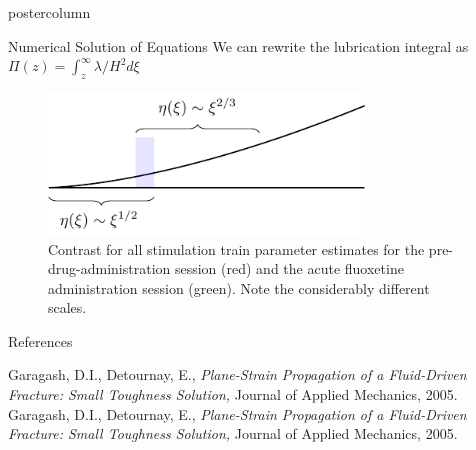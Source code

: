 \documentclass{beamer}
\begin{document}
\begin{frame}
\begin{columns}
\begin{column}{.57\textwidth}
\begin{beamercolorbox}[center]{postercolumn}
\begin{minipage}{.98\textwidth}
{\begin{myblock}{Numerical Solution of Equations}
We can rewrite the lubrication integral as
$\Pi(z) = \int_{z}^{\infty} \lambda/H^2 d\xi$
\begin{figure}
\begin{minipage}{0.85\textwidth}
\centering\includegraphics[width=0.75\textwidth, height=0.2\textwidth]
{Fig7.pdf}
\caption{Contrast for all stimulation train parameter estimates for the 
pre-drug-administration session (red) and the acute fluoxetine administration 
session (green). Note the considerably different scales.}
\label{fig:fail}
\end{minipage}
\end{figure}
\end{myblock}\vfill
\begin{myblock}{References}
\footnotesize
\begin{thebibliography}{9}  
%
Garagash, D.I., Detournay, E.,
\emph{Plane-Strain Propagation of a Fluid-Driven Fracture: Small Toughness
Solution,}
Journal of Applied Mechanics,
2005.
%
Garagash, D.I., Detournay, E.,
\emph{Plane-Strain Propagation of a Fluid-Driven Fracture: Small Toughness
Solution,}
Journal of Applied Mechanics,
2005.
%
%
\end{thebibliography}
%
%
\end{myblock}\vfill
}\end{minipage}\end{beamercolorbox}
\end{column}
\end{columns}
\end{frame}
\end{document}
